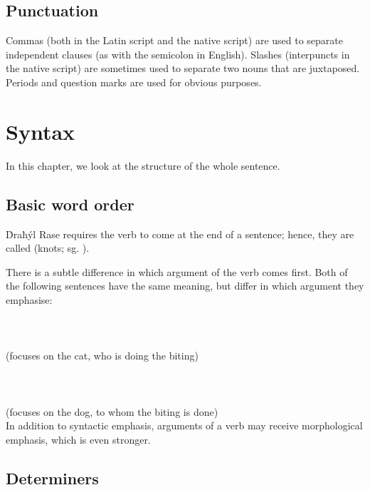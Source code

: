 \documentclass{book}
\begin{document}
\section{Punctuation}

Commas (both in the Latin script and the native script) are used to separate independent clauses (as with the semicolon in English). Slashes (interpuncts in the native script) are sometimes used to separate two nouns that are juxtaposed. Periods and question marks are used for obvious purposes.

\chapter{Syntax}

In this chapter, we look at the structure of the whole sentence.

\section{Basic word order}

Ḋraħýl Rase requires the verb to come at the end of a sentence; hence, they are called  (knots; sg. ).

There is a subtle difference in which argument of the verb comes first. Both of the following sentences have the same meaning, but differ in which argument they emphasise: \\
~\\
   \\
   \\
\emph{  } (focuses on the cat, who is doing the biting) \\
~\\
   \\
   \\
\emph{  } (focuses on the dog, to whom the biting is done) \\

In addition to syntactic emphasis, arguments of a verb may receive morphological emphasis, which is even stronger.

\section{Determiners}
\end{document}

